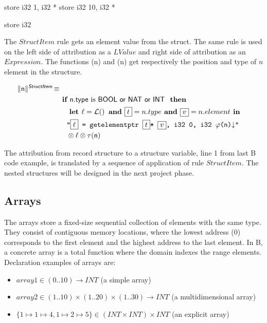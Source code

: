 \begin{llvmcode}
store i32 1, i32 * %
store i32 10, i32 * %

store i32 %
\end{llvmcode}

The $StructItem$ rule gets an element value from the struct. The same rule is used on the left side of attribution as a $LValue$ and right side of attribution as an $Expression$. The functions \SBPos(n) and \SBType(n)  get respectively the position and type of $n$ element in the structure. 

\begin{align*}
\begin{split}
  \trad{n}{\B{StructItem}} \isdef \\
   & \IF \B{n.type} \mbox{ is \B{BOOL or NAT or INT} } \THEN \\
   &\quad  \LET \ell = \lbl  \AND  \PH{t} = n.type \AND \PH{v} = n.element \IN\\
   &\quad  \llvm{"\PH{\ell} = getelementptr \PH{t}* \PH{v}, i32 0, i32  \SBPos(\B{n})\nl"} \\
   &\quad  \sep  \ell  \sep \SBType(\B{n})\\
\end{split}
\end{align*}

The attribution from record structure to a structure variable, line 1 from last 
B code example, is translated by a sequence of application of rule $StructItem$.
The nested structures will be designed in the next project phase.


\subsection{Arrays}

The arrays store a fixed-size sequential collection of elements with the same type. 
They consist of contiguous memory locations, where the lowest address (0) 
corresponds to the first element and the highest address to the last element.
In B, a concrete array is a total function where the domain indexes the range 
elements. Declaration examples of arrays are:
\begin{itemize}
	\item $array1 \in (0..10) \to INT $	(a simple array)
	\item $array2 \in (1..10) \times (1..20) \times (1..30) \to INT $   (a multidimensional array)
	\item $\{1\mapsto1\mapsto4, 1\mapsto2\mapsto5\}  \in (INT \times INT) \times INT$ (an explicit array)
\end{itemize} 


